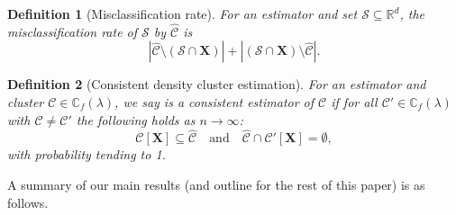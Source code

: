 \documentclass{article}
\newcommand{\abs}[1]{\left \lvert #1 \right \rvert}
\newcommand{\Reals}{\mathbb{R}}
\newcommand{\1}{\mathbf{1}}
\newcommand{\Xbf}{\mathbf{X}}
\newcommand{\Cbb}{\mathbb{C}}
\newcommand{\Cset}{\mathcal{C}}
\theoremstyle{aldenthm}
\newtheorem{definition}{Definition}
\theoremstyle{aldenrmrk}
\begin{document}
\begin{definition}[Misclassification rate]
\label{def: misclassification_rate}
For an estimator \smash{$\widehat{\Cset} \subseteq \Xbf$} and set
$\mathcal{S} \subseteq \Reals^d$, the \emph{misclassification rate} of $\mathcal{S}$ by $\widehat{\Cset}$ is
\begin{equation}
\label{eqn: misclassification_rate}
\abs{\widehat{\Cset} \setminus (\mathcal{S} \cap \Xbf)} + \abs{(\mathcal{S} \cap \Xbf) \setminus \widehat{\Cset}}.
\end{equation}
\end{definition}    

\begin{definition}[Consistent density cluster estimation]
\label{def: consistent_density_cluster_estimation}
For an estimator \smash{$\widehat{\Cset} \subseteq \Xbf$} and cluster 
$\Cset \in \Cbb_f(\lambda)$, we say \smash{$\widehat{\Cset}$} is a consistent
estimator of $\Cset$ if for all $\Cset' \in \Cbb_f(\lambda)$ with $\Cset \not=
\Cset'$ the following holds as $n \to \infty$: 
\begin{equation}
\label{eqn: consistent_density_cluster_recovery}
\Cset[\Xbf] \subseteq \widehat{\Cset} \quad \text{and} \quad
\widehat{\Cset} \cap \Cset'[\Xbf] = \emptyset,
\end{equation}
with probability tending to 1.
\end{definition}



A summary of our main results (and outline for the rest of this paper) is as
follows.  
\end{document}
